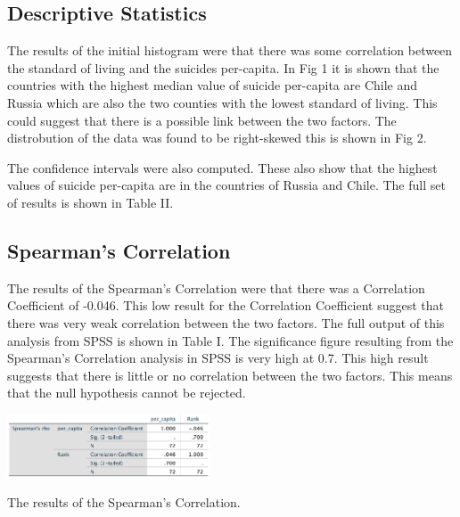 \documentclass[conference]{IEEEtran}
\begin{document}
\subsection{Descriptive Statistics}
The results of the initial histogram were that there was some correlation between the standard of living and the suicides per-capita.
In Fig 1 it is shown that the countries with the highest median value of suicide per-capita are Chile and Russia which are also the two counties with the lowest standard of living.
This could suggest that there is a possible link between the two factors. 
The distrobution of the data was found to be right-skewed this is shown in Fig 2.

The confidence intervals were also computed.
These also show that the highest values of suicide per-capita are in the countries of Russia and Chile.
The full set of results is shown in Table II.

\subsection{Spearman's Correlation}
The results of the Spearman's Correlation were that there was a Correlation Coefficient of -0.046.
This low result for the Correlation Coefficient suggest that there was very weak correlation between the two factors.
The full output of this analysis from SPSS is shown in Table I.
The significance figure resulting from the Spearman's Correlation analysis in SPSS is very high at 0.7.
This high result suggests that there is little or no correlation between the two factors.
This means that the null hypothesis cannot be rejected.

\begin{table}[b]
    \centering
    \includegraphics[width=0.45\textwidth]{spearmans}
    \caption{The results of the Spearman's Correlation.}
\end{table}
\end{document}
